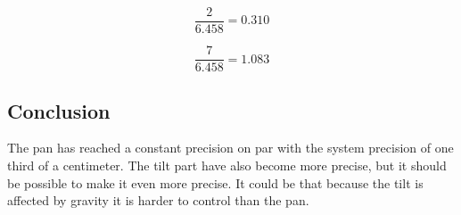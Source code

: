 \[ \frac{2}{6.458} = 0.310 \]

\[ \frac{7}{6.458} = 1.083 \]

\subsection*{Conclusion}

The pan has reached a constant precision on par with the system precision
of one third of a centimeter. The tilt part have also become more precise, but
it should be possible to make it even more precise. It could be that because the
tilt is affected by gravity it is harder to control than the pan.



